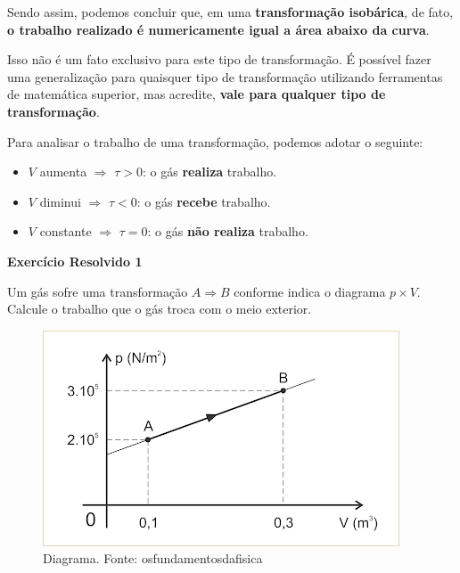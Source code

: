 \documentclass[12pt]{article}
\begin{document}
Sendo assim, podemos concluir que, em uma \textbf{transformação isobárica}, de fato, \textbf{o trabalho realizado é numericamente igual a área abaixo da curva}.


Isso não é um fato exclusivo para este tipo de transformação. É possível fazer uma generalização para quaisquer tipo de transformação utilizando ferramentas de matemática superior, mas acredite, \textbf{vale para qualquer tipo de transformação}.


Para analisar o trabalho de uma transformação, podemos adotar o seguinte:


\begin{itemize}

\item \textbf{$V$} aumenta $\Rightarrow$ \textbf{$\tau > 0$}: o gás \textbf{realiza} trabalho.

\item \textbf{$V$} diminui $\Rightarrow$ \textbf{$\tau < 0$}: o gás \textbf{recebe} trabalho.

\item \textbf{$V$} constante $\Rightarrow$ \textbf{$\tau = 0$}: o gás \textbf{não realiza} trabalho.

\end{itemize}


\textbf{Exercício Resolvido 1}


Um gás sofre uma transformação \textbf{$A\Rightarrow B$} conforme indica o diagrama \textbf{$p\times V$}. Calcule o trabalho que o gás troca com o meio exterior.


\begin{figure}[h]{}
\centering\includegraphics[width=2.5truein]{img4.1.png}
\caption{Diagrama. Fonte: osfundamentosdafisica}
\centering
\end{figure}
\end{document}
